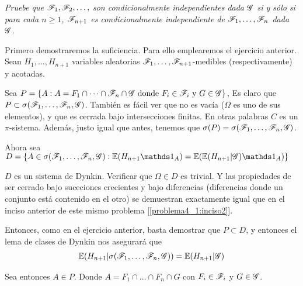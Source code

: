 \emph{
	Pruebe que $\mathscr{F}_1,\mathscr{F}_2,\ldots, $ son condicionalmente independientes dada 
	$\mathscr{G}$ si y s\'olo si para cada $n\geq 1$, $\mathscr{F}_{n+1}$ es condicionalmente 
	independiente de $\mathscr{F}_1,\ldots, \mathscr{F}_n$ dada $\mathscr{G}$. 
}

\afterstatement\pn

Primero demostraremos la suficiencia. Para ello emplearemos el ejercicio anterior.
Sean $H_1, \dots, H_{n+1}$ variables aleatorias $\mathscr{F}_1, \dots, \mathscr{F}_{n+1}$-medibles (respectivamente) 
y acotadas.\pn

Sea $P = \{ A : A = F_1 \cap \dots \cap \mathscr{F}_n \cap \mathscr{G} \text{ donde } F_i \in \mathscr{F}_i \text{ y } G \in \mathscr{G} \}$,
Es claro que $P \subset \sigma(\mathscr{F}_1, \dots, \mathscr{F}_n, \mathscr{G})$. También es fácil ver que no es vacía ($\Omega$ es uno de sus elementos), 
y que es cerrada bajo intersecciones finitas. En otras palabras $C$ es un $\pi$-sistema. Además, justo
igual que antes, tenemos que $\sigma(P) = \sigma(\mathscr{F}_1, \dots, \mathscr{F}_n, \mathscr{G})$.\pn

Ahora sea $D = \{ A \in \sigma(\F_1, \dots, \F_n, \G) : \E(H_{n+1} \indic_A) = \E(\E(H_{n+1} | \G) \indic_A) \}$

$D$ es un sistema de Dynkin. Verificar que $\Omega \in D$ es trivial. Y las propiedades de ser cerrado bajo suceciones crecientes y 
bajo diferencias (diferencias donde un conjunto está contenido en el otro) se demuestran exactamente igual que en el inciso
anterior de este mismo problema [\ref{problema4_1:inciso2}].\pn

Entonces, como en el ejercicio anterior, basta demostrar que $P \subset D$, y entonces el lema de clases
de Dynkin nos asegurará que 
\begin{align}
 \mathbb{E}(H_{n+1} | \sigma(\mathscr{F}_1, \dots, \mathscr{F}_n, \mathscr{G})) = \mathbb{E}(H_{n+1} | \mathscr{G})   \label{problema4_1:hipotesis_suficiencia_4_1_3}
\end{align}\pn

Sea entonces $A \in P$. Donde $A = F_1 \cap \dots \cap F_n \cap G$ con $F_i \in \mathscr{F}_i$ y $G \in \mathscr{G}$.

